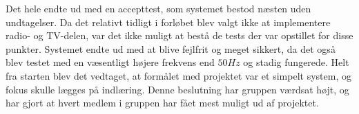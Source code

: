 Det hele endte ud med en accepttest, som systemet bestod næsten uden undtagelser. Da det relativt tidligt i forløbet blev valgt ikke at implementere radio- og TV-delen, var det ikke muligt at bestå de tests der var opstillet for disse punkter. Systemet endte ud med at blive fejlfrit og meget sikkert, da det også blev testet med en væsentligt højere frekvens end $50Hz$ og stadig fungerede. Helt fra starten blev det vedtaget, at formålet med projektet var et simpelt system, og fokus skulle lægges på indlæring. Denne beslutning har gruppen værdsat højt, og har gjort at hvert medlem i gruppen har fået mest muligt ud af projektet.
